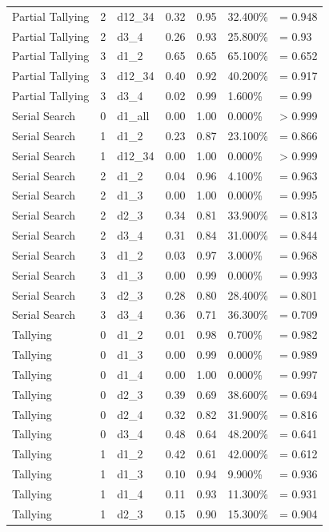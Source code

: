 \documentclass[
  english,
  man]{apa6}
\begin{document}
\begin{center}
\begin{ThreePartTable}
\begin{longtable}{lllllll}
Partial Tallying & 2 & d12\_34 & 0.32 & 0.95 & 32.400\% & = 0.948\\
Partial Tallying & 2 & d3\_4 & 0.26 & 0.93 & 25.800\% & = 0.93\\
Partial Tallying & 3 & d1\_2 & 0.65 & 0.65 & 65.100\% & = 0.652\\
Partial Tallying & 3 & d12\_34 & 0.40 & 0.92 & 40.200\% & = 0.917\\
Partial Tallying & 3 & d3\_4 & 0.02 & 0.99 & 1.600\% & = 0.99\\
Serial Search & 0 & d1\_all & 0.00 & 1.00 & 0.000\% & > 0.999\\
Serial Search & 1 & d1\_2 & 0.23 & 0.87 & 23.100\% & = 0.866\\
Serial Search & 1 & d12\_34 & 0.00 & 1.00 & 0.000\% & > 0.999\\
Serial Search & 2 & d1\_2 & 0.04 & 0.96 & 4.100\% & = 0.963\\
Serial Search & 2 & d1\_3 & 0.00 & 1.00 & 0.000\% & = 0.995\\
Serial Search & 2 & d2\_3 & 0.34 & 0.81 & 33.900\% & = 0.813\\
Serial Search & 2 & d3\_4 & 0.31 & 0.84 & 31.000\% & = 0.844\\
Serial Search & 3 & d1\_2 & 0.03 & 0.97 & 3.000\% & = 0.968\\
Serial Search & 3 & d1\_3 & 0.00 & 0.99 & 0.000\% & = 0.993\\
Serial Search & 3 & d2\_3 & 0.28 & 0.80 & 28.400\% & = 0.801\\
Serial Search & 3 & d3\_4 & 0.36 & 0.71 & 36.300\% & = 0.709\\
Tallying & 0 & d1\_2 & 0.01 & 0.98 & 0.700\% & = 0.982\\
Tallying & 0 & d1\_3 & 0.00 & 0.99 & 0.000\% & = 0.989\\
Tallying & 0 & d1\_4 & 0.00 & 1.00 & 0.000\% & = 0.997\\
Tallying & 0 & d2\_3 & 0.39 & 0.69 & 38.600\% & = 0.694\\
Tallying & 0 & d2\_4 & 0.32 & 0.82 & 31.900\% & = 0.816\\
Tallying & 0 & d3\_4 & 0.48 & 0.64 & 48.200\% & = 0.641\\
Tallying & 1 & d1\_2 & 0.42 & 0.61 & 42.000\% & = 0.612\\
Tallying & 1 & d1\_3 & 0.10 & 0.94 & 9.900\% & = 0.936\\
Tallying & 1 & d1\_4 & 0.11 & 0.93 & 11.300\% & = 0.931\\
Tallying & 1 & d2\_3 & 0.15 & 0.90 & 15.300\% & = 0.904\\

\end{longtable}
\end{ThreePartTable}
\end{center}
\end{document}
